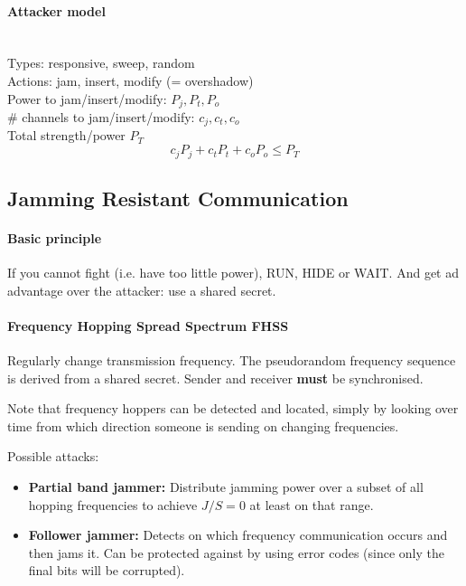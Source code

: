 \paragraph{Attacker model} \mbox{} \\
Types: responsive, sweep, random \\
Actions: jam, insert, modify (= overshadow) \\
Power to jam/insert/modify: $P_j, P_t, P_o$ \\
\# channels to jam/insert/modify: $c_j, c_t, c_o$ \\
Total strength/power $P_T$ \\
$$ c_j P_j + c_t P_t + c_o P_o \leq P_T$$

\subsection{Jamming Resistant Communication}\label{sec:jamming-resistant-comm}

\paragraph{Basic principle}
If you cannot fight (i.e. have too little power), RUN, HIDE or WAIT.
And get ad advantage over the attacker: use a shared secret.

\paragraph{Frequency Hopping Spread Spectrum FHSS}
Regularly change transmission frequency.
The pseudorandom frequency sequence is derived from a shared secret.
Sender and receiver \textbf{must} be synchronised.

Note that frequency hoppers can be detected and located, simply by looking over time from which direction someone is sending on changing frequencies.

Possible attacks:
\begin{itemize}
	\item \textbf{Partial band jammer:}
	Distribute jamming power over a subset of all hopping frequencies to achieve $J/S=0$ at least on that range.
	\item \textbf{Follower jammer:}
	Detects on which frequency communication occurs and then jams it.
	Can be protected against by using error codes (since only the final bits will be corrupted).
\end{itemize}

